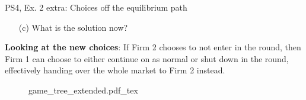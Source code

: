 \begin{frame}{PS4, Ex. 2 extra: Choices off the equilibrium path}
  \begin{multicols}{2}
    \begin{itemize}
      \item[(c)] What is the solution now?
    \end{itemize}
    \textbf{Looking at the new choices}: If Firm 2 chooses to not enter in the  round, then Firm 1 can choose to either continue on as normal or shut down in the  round, effectively handing over the whole market to Firm 2 instead.
  \vfill\null \columnbreak
    \begin{figure}[!h]
      \begin{center}
      \def\svgwidth{1.0\columnwidth}
      {game_tree_extended.pdf_tex}
      \end{center}
    \end{figure}
  \vfill\null
  \end{multicols}
\end{frame}
